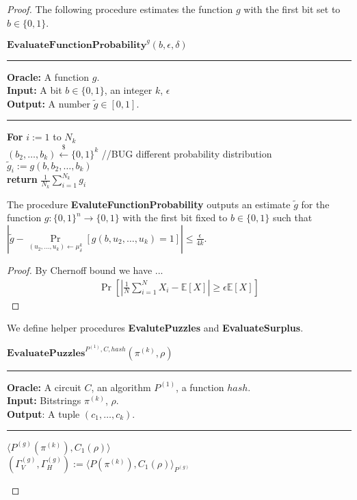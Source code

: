 \begin{proof}
%
  The following procedure estimates the function $g$ with the first bit set to $b \in \{0,1\}$.
%
\begin{codeblock}
  $\textbf{EvaluateFunctionProbability}^{g}(b, \epsilon, \delta)$
  \medskip
  \hrule
  \medskip
  \textbf{Oracle:} A function $g$.\\
  \textbf{Input:} A bit $b \in \{0,1\}$, an integer $k$, $\epsilon$ \\
  \textbf{Output:} A number $\widetilde{g} \in \left[0,1\right]$.
  \medskip\hrule\medskip
  \textbf{For} $i:=1$ to $N_k$ \Do \\
  \IndI $(b_2, \dots, b_k) \xleftarrow{\$} \{0,1\}^{k}$ //BUG different probability distribution \\
  \IndI $\widetilde{g}_i := g(b,b_2, \dots, b_k)$ \then \\
  \textbf{return} $\frac{1}{N_k} \sum_{i=1}^{N_k} g_i$
\end{codeblock}
%
\begin{lemma}
  The procedure \textbf{EvaluteFunctionProbability} outputs an estimate $\widetilde{g}$ for the function $g: \{0,1\}^{n} \rightarrow \{0,1\}$ with the first bit fixed to $b \in \{0,1\}$
  such that $\left| \widetilde{g} - \underset{(u_2,\dots,u_k) \leftarrow \mu_{\delta}^{k}}{\Pr}\left[g(b,u_2, \dots, u_k) = 1\right] \right| \leq \frac{\epsilon}{4k}$.
\end{lemma}
%
\begin{proof}
By Chernoff bound we have ...
\begin{align*}
  \underset{}{\Pr}\left[\left|\frac{1}{N} \sum_{i=1}^{N} X_i - \mathbb{E}[X]\right| \geq \epsilon \mathbb{E}[X] \right]
\end{align*}
\end{proof}
%
We define helper procedures \textbf{EvalutePuzzles} and \textbf{EvaluateSurplus}.
%
\begin{codeblock}
  $\textbf{EvaluatePuzzles}^{P^{(1)}, C, hash}(\pi^{(k)}, \rho)$
  \medskip \hrule \medskip
  \textbf{Oracle:}  A circuit $C$, an algorithm $P^{(1)}$, a function $hash$.\\
  \textbf{Input:} Bitstrings $\pi^{(k)}$, $\rho$.\\
  \textbf{Output}: A tuple $(c_1, \dots, c_k)$.
  \medskip\hrule\medskip
  \Run $\langle P^{(g)}(\pi^{(k)}), C_1(\rho) \rangle$ \\
  \IndI $(\Gamma_V^{(g)}, \Gamma_H^{(g)}) := \langle P(\pi^{(k)}), C_1(\rho) \rangle_{P^{(g)}}$ \\

\end{codeblock}
\end{proof}
